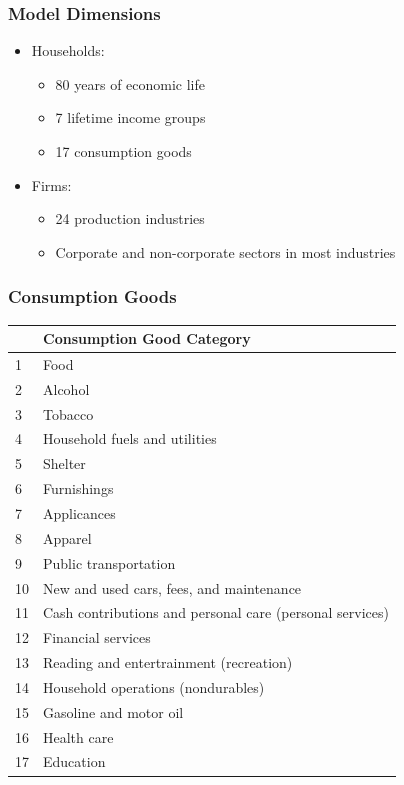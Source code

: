 \documentclass{beamer}
\begin{document}
   \begin{frame}
    \frametitle{Model Dimensions}
    \begin{itemize}
      \item Households:
      		\begin{itemize}
		\item 80 years of economic life
		\item 7 lifetime income groups
		\item 17 consumption goods
		\end{itemize}
      \item Firms:
      	\begin{itemize}
	\item 24 production industries
	\item Corporate and non-corporate sectors in most industries
	\end{itemize}
    \end{itemize}
  \end{frame}

   \begin{frame}
    \frametitle{Consumption Goods}
\begin{table}[htbp]
  \centering
  \footnotesize
    \begin{tabular}{ll}
    \hline
    \hline
          & Consumption Good Category \\
    \hline
    1     & Food  \\
    2     & Alcohol \\
    3     & Tobacco \\
    4     & Household fuels and utilities \\
    5     & Shelter \\
    6     & Furnishings \\
    7     & Applicances \\
    8     & Apparel \\
    9     & Public transportation \\
    10    & New and used cars, fees, and maintenance \\
    11    & Cash contributions and personal care (personal services) \\
    12    & Financial services \\
    13    & Reading and entertrainment (recreation) \\
    14    & Household operations (nondurables) \\
    15    & Gasoline and motor oil \\
    16    & Health care \\
    17    & Education \\
    \hline
    \hline
    \end{tabular}%
  \label{tab:addlabel}%
\end{table}%
  \end{frame}
  
\end{document}

